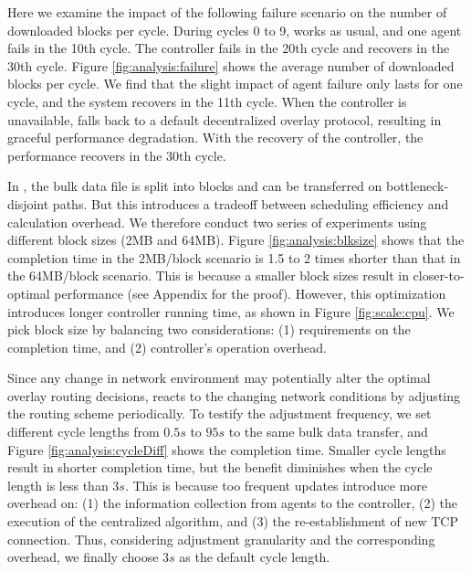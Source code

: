 
Here we examine the impact of the following failure scenario on the number of downloaded blocks per cycle. During cycles 0 to 9, \name works as usual, and one agent fails in the 10th cycle. The controller fails in the 20th cycle and recovers in the 30th cycle. Figure \ref{fig:analysis:failure} shows the average number of downloaded blocks per cycle. We find that the slight impact of agent failure only lasts for one cycle, and the system recovers in the 11th cycle. When the controller is unavailable, \name falls back to a default decentralized overlay protocol, resulting in graceful performance degradation. With the recovery of the controller, the performance recovers in the 30th cycle.

\label{subsec:evaluation:benchmarks:parameters}

 In \name, the bulk data file is split into blocks and can be transferred on bottleneck-disjoint paths. But this introduces a tradeoff between scheduling efficiency and calculation overhead. We therefore conduct two series of experiments using different block sizes (2MB and 64MB). Figure \ref{fig:analysis:blksize} shows that the completion time in the 2MB/block scenario is 1.5 to 2 times shorter than that in the 64MB/block scenario. This is because a smaller block sizes result in closer-to-optimal performance (see Appendix for the proof). However, this optimization introduces longer controller running time, as shown in Figure \ref{fig:scale:cpu}. We pick block size by balancing two considerations: (1) requirements on the completion time, and (2) controller's operation overhead.

 Since any change in network environment may potentially alter the optimal overlay routing decisions, \name reacts to the changing network conditions by adjusting the routing scheme periodically. To testify the adjustment frequency, we set different cycle lengths from $0.5s$ to $95s$ to the same bulk data transfer, and Figure \ref{fig:analysis:cycleDiff} shows the completion time. Smaller cycle lengths result in shorter completion time, but the benefit diminishes when the cycle length is less than $3s$. This is because too frequent updates introduce more overhead on: (1) the information collection from agents to the controller, (2) the execution of the centralized algorithm, and (3) the re-establishment of new TCP connection. Thus, considering adjustment granularity and the corresponding overhead, we finally choose $3s$ as the default cycle length.


